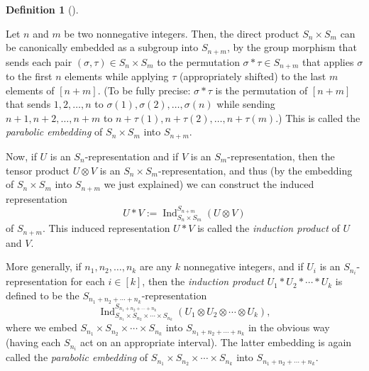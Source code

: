 \documentclass[numbers=enddot,12pt,final,onecolumn,notitlepage]{scrartcl}%
\theoremstyle{definition}
\newtheorem{defi}[theo]{Definition}
\newenvironment{definition}[1][]
{\begin{defi}[#1]\begin{leftbar}}
{\end{leftbar}\end{defi}}
\begin{document}
\begin{definition}
Let $n$ and $m$ be two nonnegative integers. Then, the direct product
$S_{n}\times S_{m}$ can be canonically embedded as a subgroup into $S_{n+m}$,
by the group morphism that sends each pair $\left(  \sigma,\tau\right)  \in
S_{n}\times S_{m}$ to the permutation $\sigma\ast\tau\in S_{n+m}$ that applies
$\sigma$ to the first $n$ elements while applying $\tau$ (appropriately
shifted) to the last $m$ elements of $\left[  n+m\right]  $. (To be fully
precise: $\sigma\ast\tau$ is the permutation of $\left[  n+m\right]  $ that
sends $1,2,\ldots,n$ to $\sigma\left(  1\right)  ,\sigma\left(  2\right)
,\ldots,\sigma\left(  n\right)  $ while sending $n+1,n+2,\ldots,n+m$ to
$n+\tau\left(  1\right)  ,n+\tau\left(  2\right)  ,\ldots,n+\tau\left(
m\right)  $.) This is called the \emph{parabolic embedding} of $S_{n}\times
S_{m}$ into $S_{n+m}$.

Now, if $U$ is an $S_{n}$-representation and if $V$ is an $S_{m}%
$-representation, then the tensor product $U\otimes V$ is an $S_{n}\times
S_{m}$-representation, and thus (by the embedding of $S_{n}\times S_{m}$ into
$S_{n+m}$ we just explained) we can construct the induced representation%
\[
U\ast V:=\operatorname*{Ind}\nolimits_{S_{n}\times S_{m}}^{S_{n+m}}\left(
U\otimes V\right)
\]
of $S_{n+m}$. This induced representation $U\ast V$ is called the
\emph{induction product} of $U$ and $V$.

More generally, if $n_{1},n_{2},\ldots,n_{k}$ are any $k$ nonnegative
integers, and if $U_{i}$ is an $S_{n_{i}}$-representation for each
$i\in\left[  k\right]  $, then the \emph{induction product }$U_{1}\ast
U_{2}\ast\cdots\ast U_{k}$ is defined to be the $S_{n_{1}+n_{2}+\cdots+n_{k}}%
$-representation%
\[
\operatorname*{Ind}\nolimits_{S_{n_{1}}\times S_{n_{2}}\times\cdots\times
S_{n_{k}}}^{S_{n_{1}+n_{2}+\cdots+n_{k}}}\left(  U_{1}\otimes U_{2}%
\otimes\cdots\otimes U_{k}\right)  ,
\]
where we embed $S_{n_{1}}\times S_{n_{2}}\times\cdots\times S_{n_{k}}$ into
$S_{n_{1}+n_{2}+\cdots+n_{k}}$ in the obvious way (having each $S_{n_{i}}$ act
on an appropriate interval\footnotemark). The latter embedding is again called
the \emph{parabolic embedding} of $S_{n_{1}}\times S_{n_{2}}\times\cdots\times
S_{n_{k}}$ into $S_{n_{1}+n_{2}+\cdots+n_{k}}$.
\end{definition}
\end{document}
